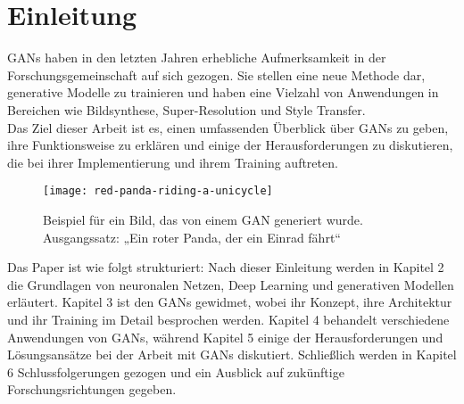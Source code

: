\chapter{Einleitung}

\noindent \acfp{GAN} haben in den letzten Jahren erhebliche Aufmerksamkeit in der Forschungsgemeinschaft auf sich gezogen. Sie stellen eine neue Methode dar, generative Modelle zu trainieren und haben eine Vielzahl von Anwendungen in Bereichen wie Bildsynthese, Super-Resolution und Style Transfer. \\

\noindent Das Ziel dieser Arbeit ist es, einen umfassenden Überblick über \acp{GAN} zu geben, ihre Funktionsweise zu erklären und einige der Herausforderungen zu diskutieren, die bei ihrer Implementierung und ihrem Training auftreten. \\

\begin{wrapfigure}{l}{0.50\textwidth}
    \centering
    \texttt{[image: red-panda-riding-a-unicycle]}
    \caption{Beispiel für ein Bild, das von einem \ac{GAN} generiert wurde. Ausgangssatz: „Ein roter Panda, der ein Einrad fährt“}
    \label{Abb:basic}
    \end{wrapfigure}

\hfill
\break
Das Paper ist wie folgt strukturiert: Nach dieser Einleitung werden in Kapitel 2 die Grundlagen von neuronalen Netzen, Deep Learning und generativen Modellen erläutert. Kapitel 3 ist den \acp{GAN} gewidmet, wobei ihr Konzept, ihre Architektur und ihr Training im Detail besprochen werden. Kapitel 4 behandelt verschiedene Anwendungen von \acp{GAN}, während Kapitel 5 einige der Herausforderungen und Lösungsansätze bei der Arbeit mit \acp{GAN} diskutiert. Schließlich werden in Kapitel 6 Schlussfolgerungen gezogen und ein Ausblick auf zukünftige Forschungsrichtungen ge\-geben. \\